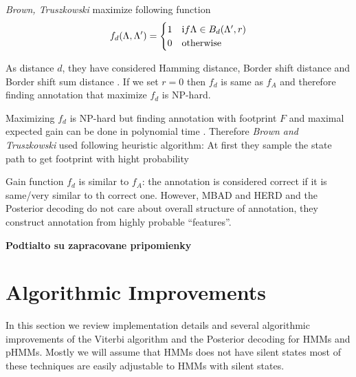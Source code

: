 {\it Brown,
Truszkowski} maximize following function
\begin{equation*}
f_d(\Lambda,\Lambda') = 
\begin{cases}
1 & {\text if }\Lambda\in B_d(\Lambda',r)\\
0 & \text{otherwise}
\end{cases}
\end{equation*}

As distance $d$, they have considered Hamming distance, Border shift distance
and Border shift sum distance \cite{Brown2010}.  If we set $r=0$ then $f_d$ is
same as $f_A$ and therefore finding annotation that maximize $f_d$ is NP-hard.

Maximizing $f_d$ is NP-hard but finding annotation with footprint $F$ and
maximal expected gain can be done in polynomial time \cite{Brown2010}. Therefore
{\it Brown and Truszkowski} used following heuristic algorithm: At first they
sample the state path to get footprint with hight probability

Gain function $f_d$ is similar to $f_A$: the annotation is considered correct if
it is same/very similar to th correct one. However, MBAD and HERD and the
Posterior decoding do not care about overall structure of annotation, they
construct annotation from highly probable ``features''.







\bigskip
{\large\bf Podtialto su zapracovane pripomienky}
\bigskip


\section{Algorithmic Improvements}

In this section we review implementation details and several algorithmic
improvements of the Viterbi algorithm and the Posterior decoding for HMMs and
pHMMs. Mostly we will assume that HMMs does not have silent states most of these
techniques are easily adjustable to HMMs with silent states. 

